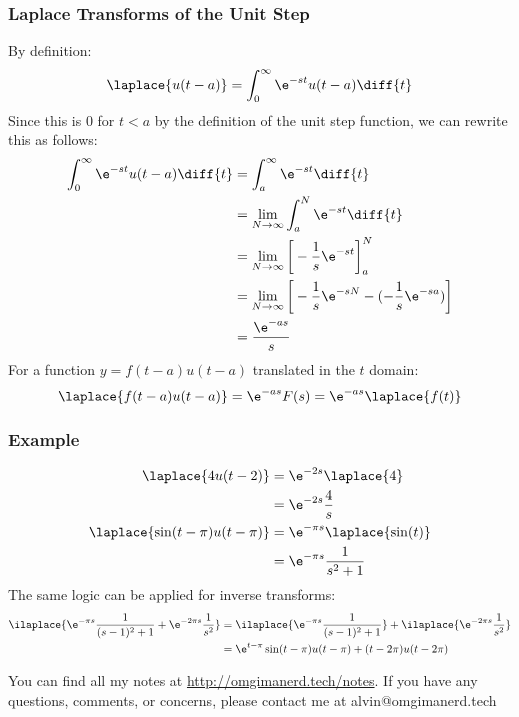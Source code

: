 \documentclass{math}
\begin{document}
\subsubsection*{Laplace Transforms of the Unit Step}
By definition:
\[ \laplace{u(t-a)} = \int_{0}^{\infty}\e^{-st}u(t-a)\diff{t} \]
Since this is 0 for \( t<a \) by the definition of the unit step function, we
can rewrite this as follows:
\begin{align*}
  \int_{0}^{\infty}\e^{-st}u(t-a)\diff{t} &=
    \int_{a}^{\infty}\e^{-st}\diff{t} \\
  &= \lim_{N\to\infty}\int_{a}^{N}\e^{-st}\diff{t} \\
  &= \lim_{N\to\infty}\bigg[-\frac{1}{s}\e^{-st}\bigg]_{a}^{N} \\
  &= \lim_{N\to\infty}\bigg[-\frac{1}{s}\e^{-sN}-(-\frac{1}{s}\e^{-sa})\bigg] \\
  &= \frac{\e^{-as}}{s}
\end{align*}
For a function \( y = f(t-a)u(t-a) \) translated in the \( t \) domain:
\[ \laplace{f(t-a)u(t-a)} = \e^{-as}F(s) = \e^{-as}\laplace{f(t)} \]

\subsubsection*{Example}
\begin{align*}
  \laplace{4u(t-2)} &= \e^{-2s}\laplace{4} \\
  &= \e^{-2s}\frac{4}{s} \\
  \laplace{\sin(t-\pi)u(t-\pi)} &= \e^{-\pi s}\laplace{\sin(t)} \\
  &= \e^{-\pi s}\frac{1}{s^2+1}
\end{align*}
The same logic can be applied for inverse transforms:
\begin{align*}
  \ilaplace{\e^{-\pi s}\frac{1}{(s-1)^2+1}+\e^{-2\pi s}\frac{1}{s^2}} &=
    \ilaplace{\e^{-\pi s}\frac{1}{(s-1)^2+1}}+
    \ilaplace{\e^{-2\pi s}\frac{1}{s^2}} \\
  &= \e^{t-\pi}\sin(t-\pi)u(t-\pi)+(t-2\pi)u(t-2\pi)
\end{align*}

\begin{center}
  You can find all my notes at \url{http://omgimanerd.tech/notes}. If you have
  any questions, comments, or concerns, please contact me at
  alvin@omgimanerd.tech
\end{center}
\end{document}
